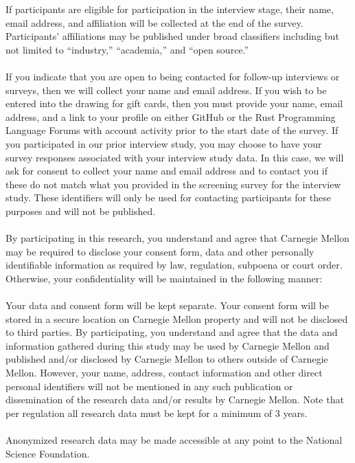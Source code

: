 \noindent{} If participants are eligible for participation in the interview stage, their name, email address, and affiliation will be collected at the end of the survey. Participants’ affiliations may be published under broad classifiers including but not limited to “industry,” “academia,” and “open source.”
\\\\
\noindent{} If you indicate that you are open to being contacted for follow-up interviews or surveys, then we will collect your name and email address. If you wish to be entered into the drawing for gift cards, then you must provide your name, email address, and a link to your profile on either GitHub or the Rust Programming Language Forums with account activity prior to the start date of the survey. If you participated in our prior interview study, you may choose to have your survey responses associated with your interview study data. In this case, we will ask for consent to collect your name and email address and to contact you if these do not match what you provided in the screening survey for the interview study. These identifiers will only be used for contacting participants for these purposes and will not be published.
\\\\
By participating in this research, you understand and agree that Carnegie Mellon may be required to disclose your consent form, data and other personally identifiable information as required by law, regulation, subpoena or court order. Otherwise, your confidentiality will be maintained in the following manner:
\\\\
Your data and consent form will be kept separate. Your consent form will be stored in a secure location on Carnegie Mellon property and will not be disclosed to third parties. By participating, you understand and agree that the data and information gathered during this study may be used by Carnegie Mellon and published and/or disclosed by Carnegie Mellon to others outside of Carnegie Mellon. However, your name, address, contact information and other direct personal identifiers will not be mentioned in any such publication or dissemination of the research data and/or results by Carnegie Mellon. Note that per regulation all research data must be kept for a minimum of 3 years.
\\\\
Anonymized research data may be made accessible at any point to the National Science Foundation.
